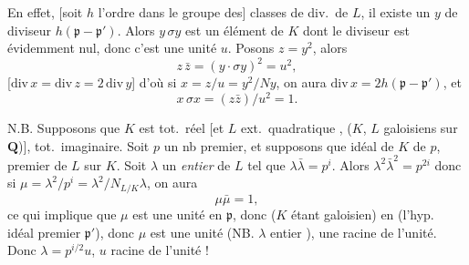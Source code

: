 \documentclass[11pt,a4paper]{article}
\begin{document}
En effet, \struck{\ill{}} [soit $h$ l'ordre \ill{} dans le groupe des]
classes de div.\ de $L$, il existe un $y$ de diviseur
$h(\mathfrak{p} - \mathfrak{p}')$. Alors $y\,\sigma y$ est un élément de
$K$ dont le diviseur est évidemment nul, donc c'est une unité $u$.
Posons $z = y^{2}$, alors
\[
  z\,\bar{z} = (y \cdot \sigma y)^{2} = u^{2} ,
\]
[$\mathrm{div}\,x = \mathrm{div}\,z = 2\,\mathrm{div}\,y$] d'où si
$x = z/u = y^{2}/Ny$, on aura
$\mathrm{div}\,x = 2h(\mathfrak{p} - \mathfrak{p}')$, et
\[
  x\,\sigma x = (z\bar{z})/u^{2} = 1 .
\]

N.B. Supposons que $K$ est tot.\ réel [et $L$ \struck{\ill{}} ext.\ quadratique , ($K$, $L$ galoisiens sur
$\mathbf{Q}$)],  tot.\ imaginaire. Soit $p$ un nb premier,
et supposons que \ill{} idéal de $K$ \ill{} de $p$, \ill{} premier
\ill{} de $L$ sur $K$. Soit $\lambda$ un \emph{entier} de $L$ tel que
$\lambda\bar{\lambda} = p^{i}$. Alors
$\lambda^{2}\bar{\lambda}^{2} = p^{2i}$ donc si
$\mu = \lambda^{2}/p^{i} = \lambda^{2}/N_{L/K}\lambda$, on aura
\[
  \mu\bar{\mu} = 1 ,
\]
\struck{\ill{}} ce qui implique que $\mu$ est une unité en $\mathfrak{p}$,
donc ($K$ étant galoisien) en \ill{} (l'hyp.\ \ill{} idéal premier \ill{}
$\mathfrak{p}'$), donc $\mu$ est une unité (NB. $\lambda$ \ill{} entier
\ill{}), une racine de l'unité. Donc $\lambda = p^{i/2}u$, $u$ racine de
l'unité !
\end{document}
